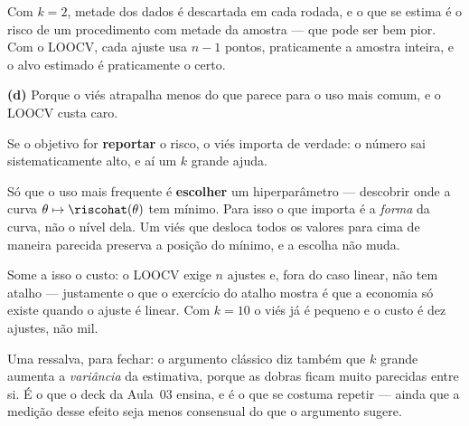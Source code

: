 \begin{solucao}
Com $k=2$, metade dos dados é descartada em cada rodada, e o que se estima é o
risco de um procedimento com metade da amostra --- que pode ser bem pior. Com o
LOOCV, cada ajuste usa $n-1$ pontos, praticamente a amostra inteira, e o alvo
estimado é praticamente o certo.

\smallskip
\textbf{(d)} Porque o viés atrapalha menos do que parece para o uso mais comum, e
o LOOCV custa caro.

Se o objetivo for \textbf{reportar} o risco, o viés importa de verdade: o número
sai sistematicamente alto, e aí um $k$ grande ajuda.

Só que o uso mais frequente é \textbf{escolher} um hiperparâmetro --- descobrir
onde a curva $\theta\mapsto\riscohat(\theta)$ tem mínimo. Para isso o que importa
é a \emph{forma} da curva, não o nível dela. Um viés que desloca todos os valores
para cima de maneira parecida preserva a posição do mínimo, e a escolha não muda.

Some a isso o custo: o LOOCV exige $n$ ajustes e, fora do caso linear, não tem
atalho --- justamente o que o exercício do atalho mostra é que a economia só
existe quando o ajuste é linear. Com $k=10$ o viés já é pequeno e o custo é dez
ajustes, não mil.

Uma ressalva, para fechar: o argumento clássico diz também que $k$
grande aumenta a \emph{variância} da estimativa, porque as dobras ficam muito
parecidas entre si. É o que o deck da Aula~03 ensina, e é o que se costuma repetir
--- ainda que a medição desse efeito seja menos consensual do que o argumento
sugere.
\end{solucao}
